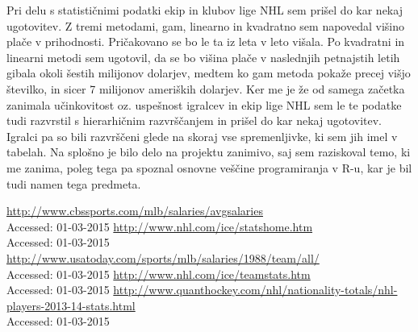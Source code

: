 \documentclass[11pt,a4paper]{article}
\begin{document}
Pri delu s statističnimi podatki ekip in klubov lige NHL sem prišel do kar nekaj ugotovitev. Z tremi metodami, gam, linearno in kvadratno sem napovedal višino plače v prihodnosti. Pričakovano se bo le ta iz leta v leto višala. Po kvadratni in linearni metodi sem ugotovil, da se bo višina plače v naslednjih petnajstih letih gibala okoli šestih milijonov dolarjev, medtem ko gam metoda pokaže precej višjo številko, in sicer 7 milijonov ameriških dolarjev. Ker me je že od samega začetka zanimala učinkovitost oz. uspešnost igralcev in ekip lige NHL sem le te podatke tudi razvrstil s hierarhičnim razvrščanjem in prišel do kar nekaj ugotovitev. Igralci pa so bili razvrščeni glede na skoraj vse spremenljivke, ki sem jih imel v tabelah. Na splošno je bilo delo na projektu zanimivo, saj sem raziskoval temo, ki me zanima, poleg tega pa spoznal osnovne veščine programiranja v R-u, kar je bil tudi namen tega predmeta.

\begin{thebibliography}{9}
  \url{http://www.cbssports.com/mlb/salaries/avgsalaries}\\
  {Accessed: 01-03-2015}
  \url{http://www.nhl.com/ice/statshome.htm}\\
  {Accessed: 01-03-2015}
  \url{http://www.usatoday.com/sports/mlb/salaries/1988/team/all/}\\
  {Accessed: 01-03-2015}
  \url{http://www.nhl.com/ice/teamstats.htm}\\
  {Accessed: 01-03-2015}
  \url{http://www.quanthockey.com/nhl/nationality-totals/nhl-players-2013-14-stats.html}\\
  {Accessed: 01-03-2015}
\end{thebibliography}
\end{document}
